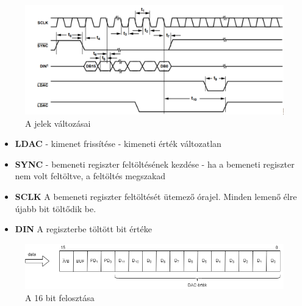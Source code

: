 \documentclass[12pt]{article}
\begin{document}
    \begin{figure}[h]
      \includegraphics[width=\textwidth,height=\textheight,keepaspectratio]{dac_jelek}
      \centering 
      \caption{A jelek változásai} 
    \end{figure}
    \newpage
    \begin{itemize}
      \item \textbf{LDAC} \linebreak
             - kimenet frissítése \linebreak
             - kimeneti érték változatlan
      \item \textbf{SYNC} \linebreak
             - bemeneti regiszter feltöltésének kezdése \linebreak
             - ha a bemeneti regiszter nem volt feltöltve, a feltöltés megszakad
      \item \textbf{SCLK} \linebreak
            \quad A bemeneti regiszter feltöltését ütemező órajel. Minden lemenő élre újabb bit töltődik be.  
      \item \textbf{DIN} \linebreak
            \quad A regiszterbe töltött bit értéke
    \end{itemize}

    \newpage
    \begin{figure}[h]
      \includegraphics[width=\textwidth,height=\textheight,keepaspectratio]{bitek}
      \centering  
      \caption{A 16 bit felosztása}
    \end{figure}
\end{document}
